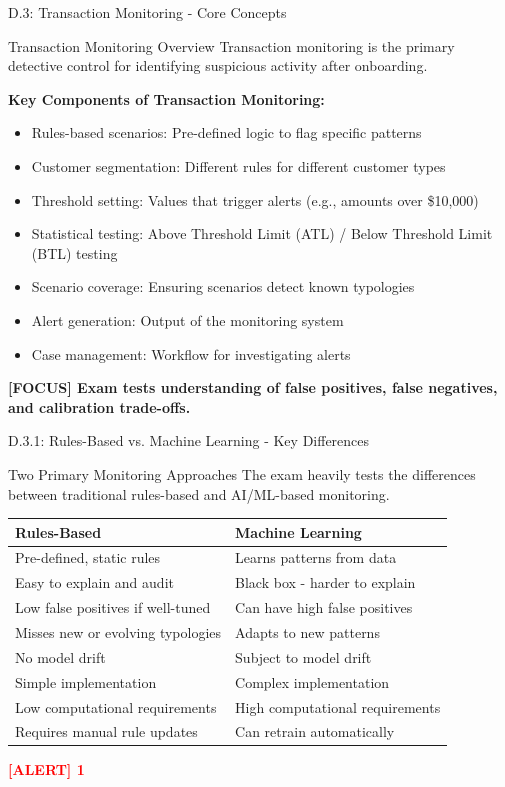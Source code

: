 \documentclass[11pt,a4paper]{beamer}
\newcommand{\redflag}[1]{\textcolor{red}{\textbf{[ALERT] 1}}}
\newcommand{\examfocus}[1]{\textcolor{orange!80!black}{\textbf{[FOCUS] #1}}}
\begin{document}
\begin{frame}{D.3: Transaction Monitoring - Core Concepts}
	\begin{block}{Transaction Monitoring Overview}
		Transaction monitoring is the primary detective control for identifying suspicious activity after onboarding.
	\end{block}
	\textbf{Key Components of Transaction Monitoring:}
	\begin{itemize}
		\item Rules-based scenarios: Pre-defined logic to flag specific patterns
		\item Customer segmentation: Different rules for different customer types
		\item Threshold setting: Values that trigger alerts (e.g., amounts over \$10,000)
		\item Statistical testing: Above Threshold Limit (ATL) / Below Threshold Limit (BTL) testing
		\item Scenario coverage: Ensuring scenarios detect known typologies
		\item Alert generation: Output of the monitoring system
		\item Case management: Workflow for investigating alerts
	\end{itemize}
	\examfocus{Exam tests understanding of false positives, false negatives, and calibration trade-offs.}
\end{frame}

\begin{frame}{D.3.1: Rules-Based vs. Machine Learning - Key Differences}
	\begin{block}{Two Primary Monitoring Approaches}
		The exam heavily tests the differences between traditional rules-based and AI/ML-based monitoring.
	\end{block}
	\begin{tabular}{p{}|p{}}
		\hline
		\rowcolor{lightgray}
		\textbf{Rules-Based} & \textbf{Machine Learning} \\
		\hline
		Pre-defined, static rules & Learns patterns from data \\
		Easy to explain and audit & Black box - harder to explain \\
		Low false positives if well-tuned & Can have high false positives \\
		Misses new or evolving typologies & Adapts to new patterns \\
		No model drift & Subject to model drift \\
		Simple implementation & Complex implementation \\
		Low computational requirements & High computational requirements \\
		Requires manual rule updates & Can retrain automatically \\
		\hline
	\end{tabular}
	\vspace{0.2cm}
	\redflag{Machine learning is NOT a replacement for rules-based monitoring. Best practice is a HYBRID approach.}
\end{frame}
\end{document}
